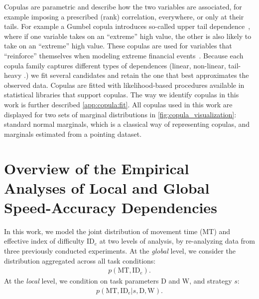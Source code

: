 \documentclass[acmlarge, manuscript,review]{acmart}
\newcommand{\mt}{\ensuremath{{\text{MT}}}\xspace}
\newcommand{\ide}{\ensuremath{{\text{ID}_e}}\xspace}
\newcommand{\D}{\ensuremath{{\text{D}}}\xspace}
\newcommand{\W}{\ensuremath{{\text{W}}}\xspace}
\begin{document}
Copulas are parametric and describe how the two variables are associated, for example imposing a prescribed (rank) correlation, everywhere, or only at their tails.
For example a Gumbel copula introduces so-called upper tail dependence~\cite{nelsen2006}, where if one variable takes on an ``extreme'' high value, the other is also likely to take on an ``extreme'' high value. These copulas are used for variables that ``reinforce'' themselves \eg when modeling extreme financial events~\cite{dewick2022}.
Because each copula family captures different types of dependences (linear, non-linear, tail-heavy \etc.) we fit several candidates and retain the one that best approximates the observed data. Copulas are fitted with likelihood-based procedures available in statistical libraries that support copulas.
The way we identify copulas in this work is further described \autoref{app:copula:fit}. All copulas used in this work are displayed for two sets of marginal distributions in \autoref{fig:copula_visualization}: standard normal marginals, which is a classical way of representing copulas, and marginals estimated from a pointing dataset. 





\section{Overview of the Empirical Analyses of Local and Global Speed-Accuracy Dependencies\label{sec:outline}}
In this work, we model the joint distribution of movement time (MT) and effective index of difficulty \ide at two levels of analysis, by re-analyzing data from three previously conducted experiments.
At the \emph{global} level, we consider the distribution aggregated across all task conditions:
\begin{align}
	p(\mt, \ide). \label{eq:joint_global}
\end{align}
At the \emph{local} level, we condition on task parameters D and W, and strategy $s$:
\begin{align}
	p(\mt, \ide | s, \D, \W). \label{eq:joint_local}
\end{align}
\end{document}
